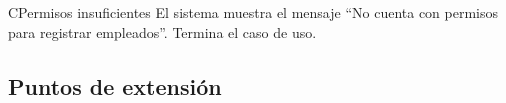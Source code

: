 \begin{UCtrayectoriaA}{C}{Permisos insuficientes}
	\UCpaso El sistema muestra el mensaje ``No cuenta con permisos para registrar empleados''.
	\UCpaso Termina el caso de uso.
\end{UCtrayectoriaA}

\subsection{Puntos de extensión}

